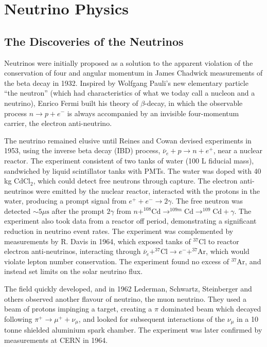 \chapter{Neutrino Physics}
\label{chap:theory}

\section{The Discoveries of the Neutrinos}
Neutrinos were initially proposed as a solution to the apparent violation of the conservation of four and angular momentum in James Chadwick measurements of the beta decay in 1932\cite{Chadwick1,Chadwick2}. Inspired by Wolfgang Pauli's new elementary particle ``the neutron'' (which had characteristics of what we today call a nucleon and a neutrino)\cite{pauli_1933}, Enrico Fermi built his theory of $\beta$-decay\cite{fermi_1934}, in which the observable process $n \rightarrow p + e^-$ is always accompanied by an invisible four-momentum carrier, the electron anti-neutrino.

The neutrino remained elusive until Reines and Cowan devised experiments\cite{reines_cowan_1,reines_cowan_2} in 1953, using the inverse beta decay (IBD) process, $\bar{\nu}_e + p \rightarrow n + e^+$, near a nuclear reactor. The experiment consistent of two tanks of water (100 L fiducial mass), sandwiched by liquid scintillator tanks with PMTs. The water was doped with 40 kg $\text{CdCl}_2$, which could detect free neutrons through capture. The electron anti-neutrinos were emitted by the nuclear reactor, interacted with the protons in the water, producing a prompt signal from $e^+ + e^- \rightarrow 2\gamma$. The free neutron was detected $\sim5\mu\text{s}$ after the prompt $2\gamma$ from $n + ^{108}\text{Cd} \rightarrow ^{109m}\text{Cd} \rightarrow ^{109}\text{Cd} + \gamma$. The experiment also took data from a reactor off period, demonstrating a significant reduction in neutrino event rates. The experiment was complemented by measurements by R. Davis\cite{davis} in 1964, which exposed tanks of $^{37}\text{Cl}$ to reactor electron anti-neutrinos, interacting through $\bar{\nu}_e + ^{37}\text{Cl} \rightarrow e^- + ^{37}\text{Ar}$, which would violate lepton number conservation. The experiment found no excess of $^{37}\text{Ar}$, and instead set limits on the solar neutrino flux.

The field quickly developed, and in 1962 Lederman, Schwartz, Steinberger and others\cite{lederman} observed another flavour of neutrino, the muon neutrino. They used a beam of protons impinging a target, creating a $\pi$ dominated beam which decayed following $\pi^+ \rightarrow \mu^+ + \nu_\mu$, and looked for subsequent interactions of the $\nu_\mu$ in a 10 tonne shielded aluminium spark chamber. The experiment was later confirmed by measurements at CERN in 1964\cite{cern_spark,cern_spark2}.

